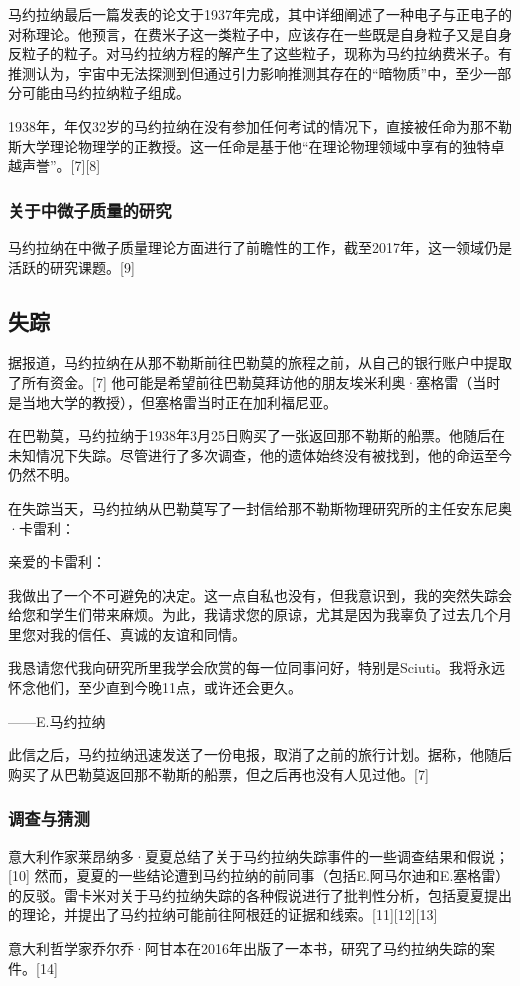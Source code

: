 马约拉纳最后一篇发表的论文于1937年完成，其中详细阐述了一种电子与正电子的对称理论。他预言，在费米子这一类粒子中，应该存在一些既是自身粒子又是自身反粒子的粒子。对马约拉纳方程的解产生了这些粒子，现称为马约拉纳费米子。有推测认为，宇宙中无法探测到但通过引力影响推测其存在的“暗物质”中，至少一部分可能由马约拉纳粒子组成。

1938年，年仅32岁的马约拉纳在没有参加任何考试的情况下，直接被任命为那不勒斯大学理论物理学的正教授。这一任命是基于他“在理论物理领域中享有的独特卓越声誉”。[7][8]
\subsubsection{关于中微子质量的研究}
马约拉纳在中微子质量理论方面进行了前瞻性的工作，截至2017年，这一领域仍是活跃的研究课题。[9]
\subsection{失踪}
据报道，马约拉纳在从那不勒斯前往巴勒莫的旅程之前，从自己的银行账户中提取了所有资金。[7] 他可能是希望前往巴勒莫拜访他的朋友埃米利奥·塞格雷（当时是当地大学的教授），但塞格雷当时正在加利福尼亚。

在巴勒莫，马约拉纳于1938年3月25日购买了一张返回那不勒斯的船票。他随后在未知情况下失踪。尽管进行了多次调查，他的遗体始终没有被找到，他的命运至今仍然不明。

在失踪当天，马约拉纳从巴勒莫写了一封信给那不勒斯物理研究所的主任安东尼奥·卡雷利：

亲爱的卡雷利：

我做出了一个不可避免的决定。这一点自私也没有，但我意识到，我的突然失踪会给您和学生们带来麻烦。为此，我请求您的原谅，尤其是因为我辜负了过去几个月里您对我的信任、真诚的友谊和同情。

我恳请您代我向研究所里我学会欣赏的每一位同事问好，特别是Sciuti。我将永远怀念他们，至少直到今晚11点，或许还会更久。

——E.马约拉纳

此信之后，马约拉纳迅速发送了一份电报，取消了之前的旅行计划。据称，他随后购买了从巴勒莫返回那不勒斯的船票，但之后再也没有人见过他。[7]
\subsubsection{调查与猜测}
意大利作家莱昂纳多·夏夏总结了关于马约拉纳失踪事件的一些调查结果和假说；[10] 然而，夏夏的一些结论遭到马约拉纳的前同事（包括E.阿马尔迪和E.塞格雷）的反驳。雷卡米对关于马约拉纳失踪的各种假说进行了批判性分析，包括夏夏提出的理论，并提出了马约拉纳可能前往阿根廷的证据和线索。[11][12][13]

意大利哲学家乔尔乔·阿甘本在2016年出版了一本书，研究了马约拉纳失踪的案件。[14]